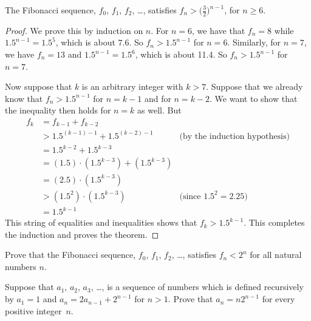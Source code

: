 \begin{theorem}\label{T-Fib}
The Fibonacci sequence, $f_0$, $f_1$, $f_2$, \dots,
satisfies $f_n > \big(\frac{3}{2}\big)^{n-1}$, for $n\ge6$.
\end{theorem}
\begin{proof}
We prove this by induction on $n$.  For $n=6$, we have that 
$f_n=8$ while $1.5^{n-1}=1.5^5$, which is about $7.6$.
So $f_n > 1.5^{n-1}$ for $n=6$.
Similarly, for $n=7$, we have $f_n=13$ and
$1.5^{n-1}=1.5^6$, which is about 11.4.
So $f_n > 1.5^{n-1}$ for $n=7$.

Now suppose that $k$ is an arbitrary integer with $k>7$.
Suppose that we already know that $f_n>1.5^{n-1}$ for
$n=k-1$ and for $n=k-2$.  We want to show that the inequality
then holds for $n=k$ as well.  But
\begin{align*}
   f_k &= f_{k-1}+f_{k-2}\\
       &> 1.5^{(k-1)-1}+1.5^{(k-2)-1} & \text{(by the induction hypothesis)}\\
       &= 1.5^{k-2}+1.5^{k-3}\\
       &= (1.5)\cdot(1.5^{k-3}) + (1.5^{k-3})\\
       &= (2.5)\cdot(1.5^{k-3})\\
       &> (1.5^2)\cdot(1.5^{k-3}) & \text{(since $1.5^2=2.25$)}\\
       &= 1.5^{k-1}
\end{align*}
This string of equalities and inequalities shows that $f_k>1.5^{k-1}$.
This completes the induction and proves the theorem.
\end{proof}



\begin{exercises}

\problem Prove that the Fibonacci sequence, $f_0$, $f_1$, $f_2$, \dots,
satisfies $f_n<2^n$ for all natural numbers $n$.

\problem Suppose that $a_1$, $a_2$, $a_3$, \dots, is a sequence of
numbers which is defined recursively by $a_1=1$ and
$a_n=2a_{n-1}+2^{n-1}$ for $n>1$.  Prove that
$a_n=n2^{n-1}$ for every positive integer~$n$.

\end{exercises}

\endinput




\endinput



